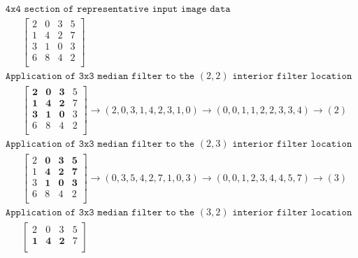 \documentclass[11pt,fleqn]{article}
\begin{document}
\begin{figure}[!ht]
\begin{mdframed}
\begin{equation*}
\begin{aligned}
&\texttt{4x4 section of representative input image data}\\
& \hspace{20pt} \begin{bmatrix}
2 & 0 & 3 & 5 \\
1 & 4 & 2 & 7 \\
3 & 1 & 0 & 3 \\
6 & 8 & 4 & 2 \\ 
\end{bmatrix} \\[10pt]
%
& \texttt{Application of 3x3 median filter to the $(2,2)$ interior filter location}\\
& \hspace{20pt} \begin{bmatrix}
\mathbf{2} & \mathbf{0} & \mathbf{3} & 5 \\
\mathbf{1} & \mathbf{4} & \mathbf{2} & 7 \\
\mathbf{3} & \mathbf{1} & \mathbf{0} & 3 \\
6 & 8 & 4 & 2 \\ 
\end{bmatrix} 
\rightarrow (2, 0, 3, 1, 4, 2, 3, 1, 0) \rightarrow (0, 0, 1, 1, 2, 2, 3, 3, 4) \rightarrow (2) \\[10pt]
%
& \texttt{Application of 3x3 median filter to the $(2,3)$ interior filter location}\\
& \hspace{20pt} \begin{bmatrix}
2 & \mathbf{0} & \mathbf{3} & \mathbf{5} \\
1 & \mathbf{4} & \mathbf{2} & \mathbf{7} \\
3 & \mathbf{1} & \mathbf{0} & \mathbf{3} \\
6 & 8 & 4 & 2 \\ 
\end{bmatrix} 
\rightarrow (0, 3, 5, 4, 2, 7, 1, 0, 3) \rightarrow (0, 0, 1, 2, 3, 4, 4, 5, 7) \rightarrow (3) \\[10pt]
%
& \texttt{Application of 3x3 median filter to the $(3,2)$ interior filter location}\\
& \hspace{20pt} \begin{bmatrix}
2 & 0 & 3 & 5 \\
\mathbf{1} & \mathbf{4} & \mathbf{2} & 7 \\

\end{bmatrix}
\end{aligned}
\end{equation*}
\end{mdframed}
\end{figure}
\end{document}

